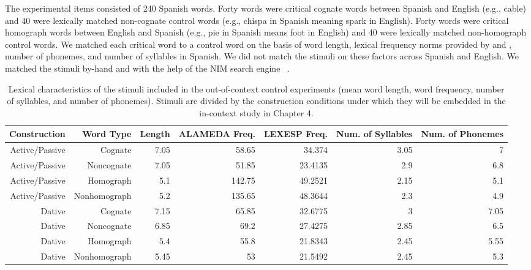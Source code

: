 The experimental items consisted of 240 Spanish words. Forty words were critical cognate words between Spanish and English (e.g., cable) and 40 were lexically matched non-cognate control words (e.g., chispa in Spanish meaning spark in English). Forty words were critical homograph words between English and Spanish (e.g., pie in Spanish means foot in English) and 40 were lexically matched non-homograph control words. We matched each critical word to a control word on the basis of word length, lexical frequency norms provided by  \citet{Alameda1995} and  \citet{Sebastian-Galles2000}, number of phonemes, and number of syllables in Spanish. We did not match the stimuli on these factors across Spanish and English. We matched the stimuli by-hand and with the help of the NIM search engine ~\citep{Guasch2013}.  
\begin{landscape}
\begin{table}[htbp]
  \centering
  \caption{Lexical characteristics of the stimuli included in the out-of-context control experiments (mean word length, word frequency, number of syllables, and number of phonemes). Stimuli are divided by the construction conditions under which they will be embedded in the in-context study in Chapter 4.}
    \tabcolsep=0.11cm
    \begin{tabular}{rrrrrrr}
    \toprule
    Construction & Word Type & Length & ALAMEDA Freq. & LEXESP Freq. & Num. of Syllables & Num. of Phonemes \\
    \midrule
    Active/Passive & Cognate & 7.05  & 58.65 & 34.374 & 3.05  & 7 \\
    Active/Passive & Noncognate & 7.05  & 51.85 & 23.4135 & 2.9   & 6.8 \\
    Active/Passive & Homograph & 5.1   & 142.75 & 49.2521 & 2.15  & 5.1 \\
    Active/Passive & Nonhomograph & 5.2   & 135.65 & 48.3644 & 2.3   & 4.9 \\
    Dative & Cognate & 7.15  & 65.85 & 32.6775 & 3     & 7.05 \\
    Dative & Noncognate & 6.85  & 69.2  & 27.4275 & 2.85  & 6.5 \\
    Dative & Homograph & 5.4   & 55.8  & 21.8343 & 2.45  & 5.55 \\
    Dative & Nonhomograph & 5.45  & 53    & 21.5492 & 2.45  & 5.3 \\
    \bottomrule
    \end{tabular}%
  \label{tab:ooc.lexchar}%
\end{table}%
\end{landscape}

